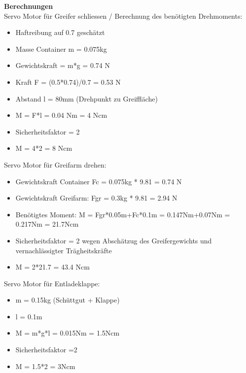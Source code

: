\textbf{Berechnungen}
\\[0.2cm]
Servo Motor für Greifer schliessen /
Berechnung des benötigten Drehmoments: 
\begin{itemize}
\item Haftreibung auf 0.7 geschätzt
\item Masse Container m = 0.075kg
\item Gewichtskraft = m*g = 0.74 N
\item Kraft F = (0.5*0.74)/0.7 = 0.53 N
\item Abstand l = 80mm (Drehpunkt zu Greiffläche)
\item M = F*l = 0.04 Nm = 4 Ncm
\item Sicherheitsfaktor = 2
\item M = 4*2 = 8 Ncm
\end{itemize}

Servo Motor für Greifarm drehen:
\begin{itemize}
\item Gewichtskraft Container Fc = 0.075kg * 9.81 = 0.74 N
\item Gewichtskraft Greifarm: Fgr = 0.3kg * 9.81 = 2.94 N
\item Benötigtes Moment:
M = Fgr*0.05m+Fc*0.1m = 0.147Nm+0.07Nm = 0.217Nm = 21.7Ncm
\item Sicherheitsfaktor = 2 wegen Abschätzug des Greifergewichts und vernachlässigter Trägheitskräfte
\item M = 2*21.7 = 43.4 Ncm
\end{itemize}

Servo Motor für Entladeklappe:
\begin{itemize}
\item m = 0.15kg (Schüttgut + Klappe)
\item l = 0.1m
\item M = m*g*l = 0.015Nm = 1.5Ncm
\item Sicherheitsfaktor =2
\item M = 1.5*2 = 3Ncm
\end{itemize}